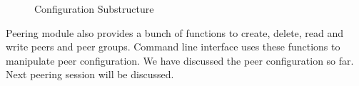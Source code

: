\begin{figure}
\centering
{}
\caption{Configuration Substructure}
\label{fig:configurationSub}
\end{figure}

Peering module also provides a bunch of functions to create, delete, read and write peers and peer groups.  Command line interface uses these functions to manipulate peer configuration. We have discussed the peer configuration so far. Next peering session will be discussed. 

